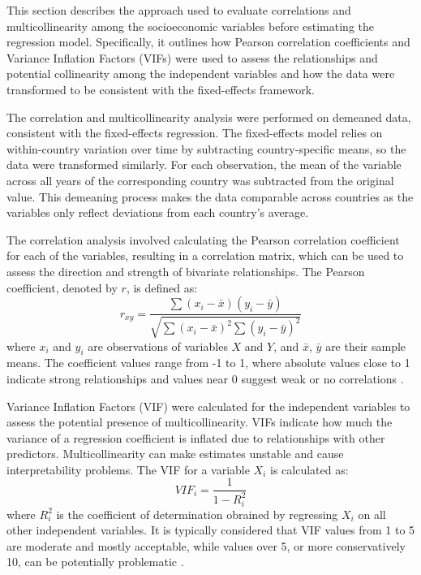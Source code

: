 This section describes the approach used to evaluate correlations and multicollinearity among the socioeconomic variables before estimating the regression model.
Specifically, it outlines how Pearson correlation coefficients and Variance Inflation Factors (VIFs) were used to assess the relationships and potential collinearity among the independent variables and how the data were transformed to be consistent with the fixed-effects framework.

The correlation and multicollinearity analysis were performed on demeaned data, consistent with the fixed-effects regression. 
The fixed-effects model relies on within-country variation over time by subtracting country-specific means, so the data were transformed similarly. 
For each observation, the mean of the variable across all years of the corresponding country was subtracted from the original value. 
This demeaning process makes the data comparable across countries as the variables only reflect deviations from each country's average. 

The correlation analysis involved calculating the Pearson correlation coefficient for each of the variables, resulting in a correlation matrix, which can be used to assess the direction and strength of bivariate relationships.
The Pearson coefficient, denoted by $r$, is defined as:
\begin{equation*}
    r_{xy} = \frac{\sum(x_i - \bar{x})(y_i - \bar{y})}{\sqrt{\sum(x_i - \bar{x})^2 \sum(y_i - \bar{y})^2}}
\end{equation*}
where $x_i$ and $y_i$ are observations of variables $X$ and $Y$, and $\bar{x}$, $\bar{y}$ are their sample means. 
The coefficient values range from -1 to 1, where absolute values close to 1 indicate strong relationships and values near 0 suggest weak or no correlations \parencite{cohen_bivariate_2003}. 

Variance Inflation Factors (VIF) were calculated for the independent variables to assess the potential presence of multicollinearity. 
VIFs indicate how much the variance of a regression coefficient is inflated due to relationships with other predictors. 
Multicollinearity can make estimates unstable and cause interpretability problems. 
The VIF for a variable $X_i$ is calculated as:
\begin{equation*}
    VIF_i = \frac{1}{1-R^2_i}
\end{equation*}
where $R^2_i$ is the coefficient of determination obrained by regressing $X_i$ on all other independent variables. 
It is typically considered that VIF values from 1 to 5 are moderate and mostly acceptable, while values over 5, or more conservatively 10, can be potentially problematic \parencite{obrien_caution_2007}.

